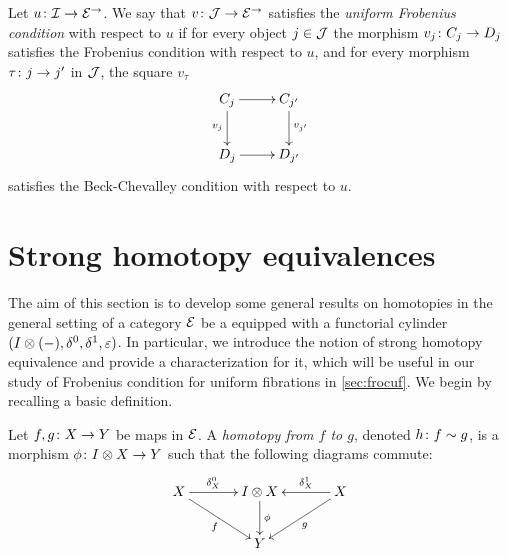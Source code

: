 \documentclass[reqno,10pt,a4paper,oneside,draft]{amsart}
\begin{document}
\begin{definition}
Let $u \co \cal{I} \to \catE^\to$. We say that $v \co \cal{J} \to \catE^\to$  satisfies the \emph{uniform Frobenius condition} 
with respect to $u$ if  for every object $j \in \cal{J}$ the morphism $v_j \co C_j \to D_j$ satisfies the Frobenius condition with respect to $u$, and for every morphism $\tau \co j \to j'$ in $\cal{J}$, the square $v_\tau$
\[
\xymatrix{
C_j \ar[r] \ar[d]_{v_j} & C_{j'} \ar[d]^{v_{j'}} \\
D_j \ar[r] & D_{j'}}
\]
satisfies the Beck-Chevalley condition with respect to $u$.
\end{definition}




\section{Strong homotopy equivalences}
\label{sec:strhe}

The aim of this section is to develop some general results on homotopies in the general setting of a category $\catE$ be a equipped with a functorial cylinder $(\interval \otimes (-), \lcyl, \rcyl, \ccyl)$.
In particular, we introduce the notion of strong homotopy equivalence and provide a characterization for it, which will be useful in our study of Frobenius condition for uniform fibrations in \cref{sec:frocuf}.
We begin by recalling a basic definition.

\begin{definition} \label{def:homotopy}
Let $f, g \co X \to Y$ be maps in $\catE$.
A \emph{homotopy from $f$ to $g$}, denoted $h \co f \sim g$, is a morphism
$\phi \co \interval \otimes X \to Y$ such that the following diagrams commute:
\[
\xymatrix@C=1.2cm{
  X \ar[r]^-{\lcyl_X} \ar[dr]_{f} & \interval \otimes X \ar[d]^-{\phi} & X \ar[dl]^{g} \ar[l]_-{\rcyl_X} \\
  & Y &
}
\]
\end{definition}
\end{document}
